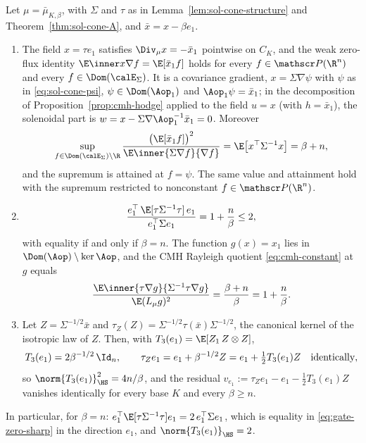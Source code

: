 \documentclass[../main.tex]{subfiles}
\begin{document}
\begin{theorem}
\label{thm:sol-cone-B}
Let $\mu=\bar\mu_{K,\beta}$, with $\Sigma$ and $\tau$ as in Lemma~\ref{lem:sol-cone-structure}
and Theorem~\ref{thm:sol-cone-A}, and $\bar x=x-\beta e_1$.
\begin{enumerate}[label=(\roman*),leftmargin=2.8em]
  \item The field $x=\tau e_1$ satisfies $\Div_\mu x=-\bar x_1$ pointwise on $C_K$, and the
  weak zero-flux identity $\E\inner x{\nabla f}=\E[\bar x_1f]$ holds for every
  $f\in\mathscr P(\R^n)$ and every $f\in\Dom(\calE_\Sigma)$.  It is a covariance gradient,
  $x=\Sigma\nabla\psi$ with $\psi$ as in \eqref{eq:sol-cone-psi}, $\psi\in\Dom(\Aop_1)$ and
  $\Aop_1\psi=\bar x_1$; in the decomposition of Proposition~\ref{prop:cmh-hodge} applied to
  the field $u=x$ (with $h=\bar x_1$), the solenoidal part is $w=x-\Sigma\nabla\Aop_1^{-1}\bar x_1=0$.
  Moreover
  \begin{equation}
    \sup_{f\in\Dom(\calE_\Sigma)\setminus\R}
    \frac{\bigl(\E[\bar x_1f]\bigr)^2}{\E\inner{\Sigma\nabla f}{\nabla f}}
    =\E\bigl[x^\top\Sigma^{-1}x\bigr]=\beta+n,
    \label{eq:sol-cone-hminus1}
  \end{equation}
  and the supremum is attained at $f=\psi$.  The same value and attainment hold with the
  supremum restricted to nonconstant $f\in\mathscr P(\R^n)$.
  \item
  \[
    \frac{e_1^\top\,\E[\tau\Sigma^{-1}\tau]\,e_1}{e_1^\top\Sigma e_1}=1+\frac n\beta\le2,
  \]
  with equality if and only if $\beta=n$.  The function $g(x)=x_1$ lies in
  $\Dom(\Aop)\setminus\ker\Aop$, and the CMH Rayleigh quotient \eqref{eq:cmh-constant} at
  $g$ equals
  \[
    \frac{\E\inner{\tau\nabla g}{\Sigma^{-1}\tau\nabla g}}{\E(L_\mu g)^2}
    =\frac{\beta+n}{\beta}=1+\frac n\beta .
  \]
  \item Let $Z=\Sigma^{-1/2}\bar x$ and $\tau_Z(Z)=\Sigma^{-1/2}\tau(\bar x)\Sigma^{-1/2}$, the
  canonical kernel of the isotropic law of $Z$.  Then, with
  $T_3(e_1)=\E[Z_1\,Z\otimes Z]$,
  \[
    T_3(e_1)=2\beta^{-1/2}\,\Id_n,\qquad
    \tau_Ze_1=e_1+\beta^{-1/2}Z=e_1+\tfrac12T_3(e_1)Z\quad\text{identically},
  \]
  so $\norm{T_3(e_1)}_{\HS}^2=4n/\beta$, and the residual
  $v_{e_1}:=\tau_Ze_1-e_1-\tfrac12T_3(e_1)Z$ vanishes identically for every base $K$ and every
  $\beta\ge n$.
\end{enumerate}
In particular, for $\beta=n$: $e_1^\top\E[\tau\Sigma^{-1}\tau]e_1=2\,e_1^\top\Sigma e_1$,
which is equality in \eqref{eq:gate-zero-sharp} in the direction $e_1$, and
$\norm{T_3(e_1)}_{\HS}=2$.
\end{theorem}
\end{document}
